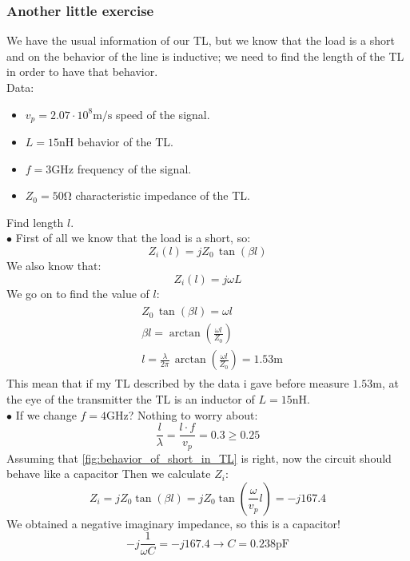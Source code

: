 \subsubsection*{Another little exercise}
We have the usual information of our TL, but we know that the load is a short and on the behavior of the line is inductive; we need to find the length of the TL in order to have that behavior.\\
Data:
\begin{itemize}
    \item $v_p=2.07\cdot 10^{8}\si{\metre \per \second}$ speed of the signal.
    \item $L=15\si{\nano\henry}$ behavior of the TL.
    \item $f=3\si{\giga\hertz}$ frequency of the signal.
    \item $Z_0=50\si{\ohm}$ characteristic impedance of the TL.
\end{itemize}
Find length $l$.\\
$\bullet$ First of all we know that the load is a short, so:
\begin{equation*}
    Z_i(l)=jZ_0\, \tan(\beta l)
\end{equation*}
We also know that:
\begin{equation*}
    Z_i(l)=j\omega L
\end{equation*}
We go on to find the value of $l$:
\begin{align*}
    \begin{split}
      &Z_0\,\tan(\beta l)=\omega l\\[5pt]
      &\beta l=\arctan(\frac{\omega l}{Z_0})\\[5pt]
      &l=\frac{\lambda}{2\pi}\,\arctan(\frac{\omega l}{Z_0})=1.53\si{\metre}
    \end{split}
\end{align*}
This mean that if my TL described by the data i gave before measure $1.53\si{\metre}$, at the eye of the transmitter the TL is an inductor of $L=15\si{\nano\henry}$.\\
$\bullet$ If we change $f=4\si{\giga\hertz}$? Nothing to worry about:
\begin{equation*}
    \frac{l}{\lambda}=\frac{l\cdot f}{v_p}=0.3\geq 0.25
\end{equation*}
Assuming that \cref{fig:behavior_of_short_in_TL} is right, now the circuit should behave like a capacitor
Then we calculate $Z_i$:
\begin{equation*}
    Z_i=jZ_0\tan(\beta l)=jZ_0\tan(\frac{\omega}{v_p} l)=-j167.4
\end{equation*}
We obtained a negative imaginary impedance, so this is a capacitor!
\begin{equation*}
    -j\frac{1}{\omega C}=-j167.4 \rightarrow C=0.238\si{\pico\farad}
\end{equation*}
